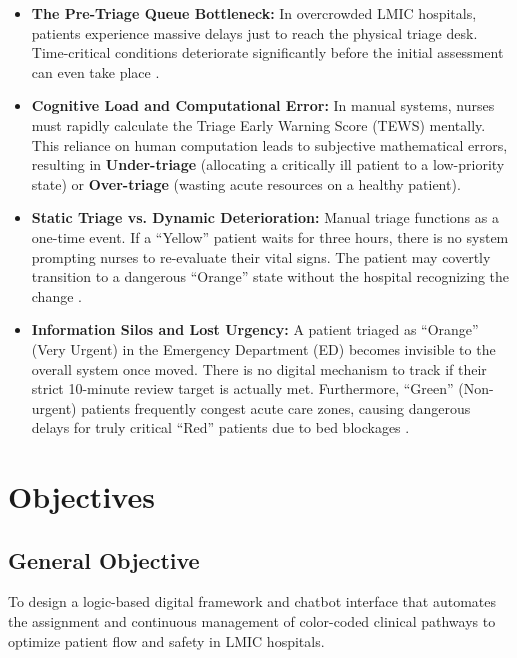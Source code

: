 \documentclass[12pt, a4paper]{article}
\begin{document}
	\begin{itemize}
		\item \textbf{The Pre-Triage Queue Bottleneck:} In overcrowded LMIC hospitals, patients experience massive delays just to reach the physical triage desk. Time-critical conditions deteriorate significantly before the initial assessment can even take place \cite{mitchell2023}.
		
		\item \textbf{Cognitive Load and Computational Error:} In manual systems, nurses must rapidly calculate the Triage Early Warning Score (TEWS) mentally. This reliance on human computation leads to subjective mathematical errors, resulting in \textbf{Under-triage} (allocating a critically ill patient to a low-priority state) or \textbf{Over-triage} (wasting acute resources on a healthy patient).
		
		\item \textbf{Static Triage vs. Dynamic Deterioration:} Manual triage functions as a one-time event. If a ``Yellow'' patient waits for three hours, there is no system prompting nurses to re-evaluate their vital signs. The patient may covertly transition to a dangerous ``Orange'' state without the hospital recognizing the change \cite{nurchis2025}.
		
		\item \textbf{Information Silos and Lost Urgency:} A patient triaged as ``Orange'' (Very Urgent) in the Emergency Department (ED) becomes invisible to the overall system once moved. There is no digital mechanism to track if their strict 10-minute review target is actually met. Furthermore, ``Green'' (Non-urgent) patients frequently congest acute care zones, causing dangerous delays for truly critical ``Red'' patients due to bed blockages \cite{nurchis2025}.
	\end{itemize}
	
	\section{Objectives}
	\subsection*{General Objective}
	To design a logic-based digital framework and chatbot interface that automates the assignment and continuous management of color-coded clinical pathways to optimize patient flow and safety in LMIC hospitals.
	
\end{document}
